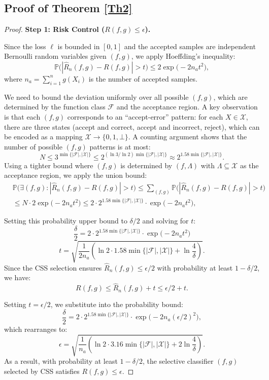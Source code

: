 \documentclass[sigconf,review,anonymous]{acmart}
\theoremstyle{remark}
\begin{document}
\subsection{Proof of Theorem \ref{Th2}}\label{S6-2}

\begin{proof}
\textbf{Step 1: Risk Control ($R(f,g) \leq \epsilon$).}


Since the loss $\ell$ is bounded in $[0,1]$ and the accepted samples are independent Bernoulli random variables given $(f,g)$, we apply Hoeffding's inequality:
\[
\mathbb{P}\bigl(|\hat{R}_n(f,g) - R(f,g)| > t\bigr) \leq 2\exp\bigl(-2n_a t^2\bigr),
\]
where $n_a = \sum_{i=1}^n g(X_i)$ is the number of accepted samples.

We need to bound the deviation uniformly over all possible $(f,g)$, which are determined by the function class $\mathcal{F}$ and the acceptance region. A key observation is that each $(f,g)$ corresponds to an ``accept-error'' pattern: for each $X \in \mathcal{X}$, there are three states (accept and correct, accept and incorrect, reject), which can be encoded as a mapping $\mathcal{X} \to \{0,1,\bot\}$.
A counting argument shows that the number of possible $(f,g)$ patterns is at most:
\[
N \leq 3^{\min\{|\mathcal{F}|,|\mathcal{X}|\}} \leq 2^{(\ln 3 / \ln 2) \min\{|\mathcal{F}|,|\mathcal{X}|\}} \approx 2^{1.58 \min\{|\mathcal{F}|,|\mathcal{X}|\}}.
\]
Using a tighter bound where $(f,g)$ is determined by $(f, \Lambda)$ with $\Lambda \subseteq \mathcal{X}$ as the acceptance region, we apply the union bound:
\begin{align*}
    & \mathbb{P}\bigl(\exists (f,g) : |\hat{R}_n(f,g) - R(f,g)| > t\bigr) \leq \sum_{(f,g)} \mathbb{P}\bigl(|\hat{R}_n(f,g) - R(f,g)| > t\bigr) \\
    & \leq N \cdot 2\exp\bigl(-2n_{a} t^2\bigr) \leq 2 \cdot 2^{1.58 \min\{|\mathcal{F}|,|\mathcal{X}|\}} \cdot \exp\bigl(-2n_{a} t^2\bigr),
\end{align*}

Setting this probability upper bound to $\delta/2$ and solving for $t$:
\[
\frac{\delta}{2} = 2 \cdot 2^{1.58\min\{|\mathcal{F}|,|\mathcal{X}|\}} \cdot \exp\bigl(-2n_{a} t^2\bigr)
\]
\[
t = \sqrt{\frac{1}{2n_{a}} \left( \ln 2 \cdot 1.58\min\{|\mathcal{F}|,|\mathcal{X}|\} + \ln \frac{4}{\delta} \right)}.
\]
Since the CSS selection ensures $\hat{R}_n(f,g) \leq \epsilon/2$ with probability at least $1-\delta/2$, we have:
\[
R(f,g) \leq \hat{R}_n(f,g) + t \leq \epsilon/2 + t.
\]


Setting $t = \epsilon/2$, we substitute into the probability bound:
\[
\frac{\delta}{2} = 2 \cdot 2^{1.58\min\{|\mathcal{F}|,|\mathcal{X}|\}} \cdot \exp\bigl(-2n_{a} (\epsilon/2)^2\bigr),
\]
which rearranges to:
\[
\epsilon = \sqrt{\frac{1}{n_{a}} \left( \ln 2 \cdot 3.16\min\{|\mathcal{F}|,|\mathcal{X}|\} + 2\ln \frac{4}{\delta} \right)}.
\]
As a result, with probability at least $1-\delta/2$, the selective classifier $(f,g)$ selected by CSS satisfies $R(f,g) \leq \epsilon$.


\end{proof}
\end{document}
